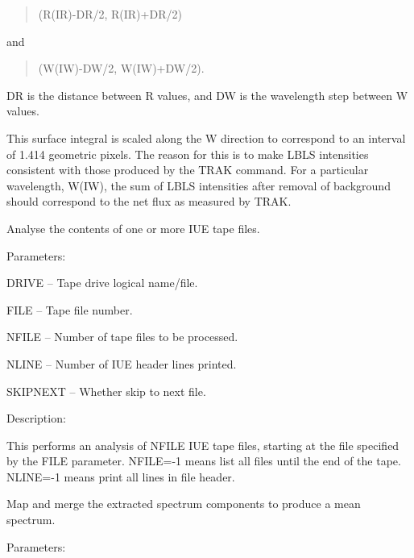 \begin {description}
\begin {description}
\begin {quote}
(R(IR)-DR/2, R(IR)+DR/2)
\end {quote}
and

\begin {quote}
(W(IW)-DW/2, W(IW)+DW/2).
\end {quote}
DR is the distance between R values, and DW is the wavelength step
between W values.

This surface integral is scaled along the W direction to
correspond to an interval of 1.414 geometric pixels.
The reason for this is to make LBLS intensities consistent with 
those produced by the TRAK command.
For a particular wavelength, W(IW), the sum of LBLS intensities
after removal of background should correspond to the net
flux as measured by TRAK.
\end {description}

\item [LISTIUE]
Analyse the contents of one or more IUE tape files.

\begin {description}
\item Parameters:

\begin {description}
\item DRIVE -- Tape drive logical name/file.
\item FILE -- Tape file number.
\item NFILE -- Number of tape files to be processed.
\item NLINE -- Number of IUE header lines printed.
\item SKIPNEXT -- Whether skip to next file.
\end {description}

\item Description:

This performs an analysis of NFILE IUE tape files, starting at
the file specified by the FILE parameter.
NFILE=-1 means list all files until the end of the tape.
NLINE=-1 means print all lines in file header.
\end {description}

\item [MAP]
Map and merge the extracted spectrum components to produce a mean spectrum.

\begin {description}
\item Parameters:


\end{description}
\end{description}

